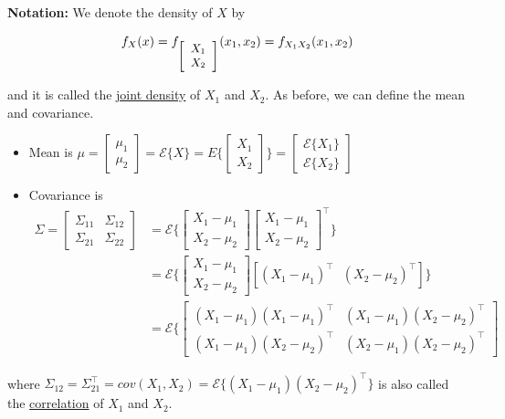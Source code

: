 \documentclass[letterpaper]{article}
\newcommand{\E}{\mathcal{E}}
\begin{document}
\textbf{Notation:} We denote the density of $X$ by

$$f_X(x)=f_{\small \left[ \begin{array}{cc} X_1 \\
                                               X_2 \end{array} \right]}(x_1,x_2)=f_{X_1 X_2}(x_1,x_2) $$

and it is called the \ul{joint density} of $X_1$ and $X_2$. As before, we can define the mean and covariance.

 \begin{itemize}

 \item Mean is $\mu=
        \left[ \begin{array}{ccc}\mu_1\\ \mu_2 \end{array} \right]= \E\{X\}=E\{\left[ \begin{array}{ccc}X_1\\ X_2\end{array} \right]\}=\left[ \begin{array}{ccc}\E \{X_1\}\\ \E\{X_2\}\end{array} \right]$

 \item Covariance is \begin{align*} \Sigma =    \left[ \begin{array}{cc}\Sigma_{11} & \Sigma_{12}\\ \Sigma_{21} & \Sigma_{22}\end{array} \right] &= \E\{\left[ \begin{array}{c}X_1-\mu_1\\ X_2-\mu_2\end{array} \right] \left[ \begin{array}{c}X_1-\mu_1\\ X_2-\mu_2\end{array} \right]^\top\}  \\
     &= \E\{\left[ \begin{array}{c}X_1-\mu_1\\ X_2-\mu_2\end{array} \right] \left[ (X_1-\mu_1)^\top~~~ (X_2-\mu_2)^\top  \right] \} \\
     &= \E\{\left[ \begin{array}{cc}(X_1-\mu_1)(X_1-\mu_1)^\top &(X_1-\mu_1)(X_2-\mu_2)^\top \\
     (X_1-\mu_1)(X_2-\mu_2)^\top &(X_2-\mu_1)(X_2-\mu_2)^\top
     \end{array} \right]
     \end{align*}
 \end{itemize}
 where $\Sigma_{12}=\Sigma_{21}^\top = cov(X_1,X_2)=\E\{ (X_1-\mu_1)(X_2-\mu_2)^\top  \}$ is also called the \ul{correlation} of $X_1$ and $X_2$.
\end{document}
